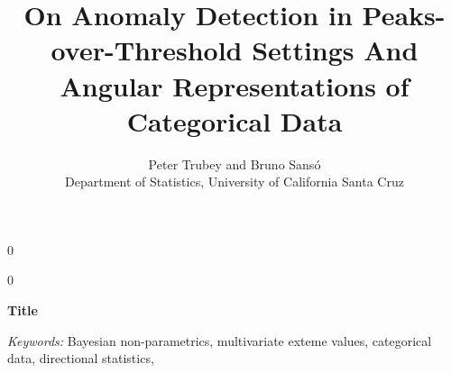 \documentclass[12pt]{article}
\title{On Anomaly Detection in Peaks-over-Threshold Settings
    And Angular Representations of Categorical Data}
\author{Peter Trubey and Bruno Sans\'o\\
Department of Statistics, University of California Santa Cruz\\
}
\newcommand{\blind}{0}
\begin{document}
\def\spacingset#1{\renewcommand{\baselinestretch}%
{#1}\small\normalsize} \spacingset{1}
\blind
{
  \maketitle
} \fi
{}\blind
{
  \bigskip
  \bigskip
  \bigskip
  \begin{center}
    {\LARGE\bf Title}
\end{center}
  \medskip
} \fi

\bigskip
\begin{abstract}  
  
\end{abstract}

\noindent%
{\it Keywords:}  Bayesian non-parametrics, multivariate exteme values, 
  categorical data, directional statistics, 
\vfill

\newpage
\spacingset{1.8} %







% 











%



\end{document}
